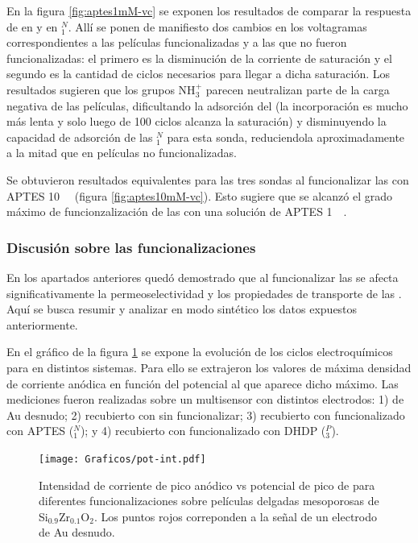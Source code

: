 		  
		  \vspace*{3mm} En la figura \ref{fig:aptes1mM-vc} se exponen los resultados de comparar la respuesta de \ru\space en \pdmZ\space y en \pdmZ$^N_1$. Allí se ponen de manifiesto dos cambios en los voltagramas correspondientes a las películas funcionalizadas y a las que no fueron funcionalizadas: el primero es la disminución de la corriente de saturación y el segundo es la cantidad de ciclos necesarios para llegar a dicha saturación. Los resultados sugieren que los grupos NH$_3^+$ parecen neutralizan parte de la carga negativa de las películas\cite{calvo2009f}, dificultando la adsorción del \ru\space (la incorporación es mucho más lenta y solo luego de 100 ciclos alcanza la saturación) y disminuyendo la capacidad de adsorción de las \pdmZ$^N_{1}$ para esta sonda, reduciendola aproximadamente a la mitad que en películas no funcionalizadas.

		  Se obtuvieron resultados equivalentes para las tres sondas al funcionalizar las \pdmZ\space con APTES \SI{10}{\milli\Molar} (figura \ref{fig:aptes10mM-vc}). Esto sugiere que se alcanzó el grado máximo de funcionzalización de las \pdmZ\space con una solución de APTES \SI{1}{\milli\Molar}.

	 	\subsubsection{Discusión sobre las funcionalizaciones}

	 	 En los apartados anteriores quedó demostrado que al funcionalizar las \pdmZ\space se afecta significativamente la permeoselectividad y los propiedades de transporte de las \pdm. Aquí se busca resumir y analizar en modo sintético los datos expuestos anteriormente. 

	 	 En el gráfico de la figura \ref{fig:pot-int} se expone la evolución de los ciclos electroquímicos para \ru\space en distintos sistemas. Para ello se extrajeron los valores de máxima densidad de corriente anódica en función del potencial al que aparece dicho máximo. Las mediciones fueron realizadas sobre un multisensor con distintos electrodos: 1) de Au desnudo; 2) recubierto con \pdmZ\space sin funcionalizar; 3) recubierto con \pdmZ\space funcionalizado con APTES (\pdmZ$^N_1$); y 4) recubierto con \pdmZ\space funcionalizado con DHDP (\pdmZ$^P_3$).

	 			 \begin{figure}[h!]	
					\centering
			 	    \texttt{[image: Graficos/pot-int.pdf]}
			        \caption[Evolución de la señal de \ru\space para distintos sistemas]{Intensidad de corriente de pico anódico vs potencial de pico de \aminorutenio\space para diferentes funcionalizaciones sobre películas delgadas mesoporosas de Si$_{0.9}$Zr$_{0.1}$O$_2$. Los puntos rojos correponden a la señal de un electrodo de Au desnudo.}
			        \label{fig:pot-int}
			        \vspace*{3mm}
			      	\end{figure}

